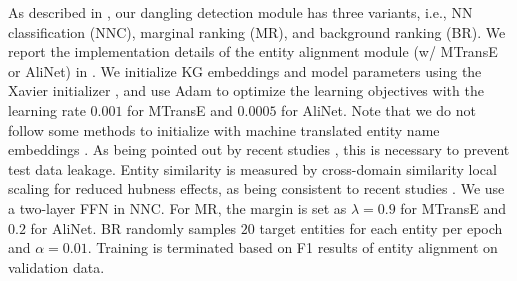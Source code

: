 \label{sec:config}
As described in , our dangling detection module has three variants, i.e., NN classification (NNC), marginal ranking (MR), and background ranking (BR). 
We report the implementation details of the entity alignment module (w/ MTransE or AliNet) in .
We initialize KG embeddings and model parameters using the Xavier initializer \cite{Xavier}, and use Adam \cite{Adam} to optimize the learning objectives with the learning rate $0.001$ for MTransE and $0.0005$ for AliNet. 
Note that we do not follow some methods to initialize with machine translated entity name embeddings \cite{NMN_acl20}.
As being pointed out by recent studies \cite{JEANS,EVA,AttrGNN}, this is necessary to prevent test data leakage.
Entity similarity is measured by cross-domain similarity local scaling \cite{CSLS} for reduced hubness effects, as being consistent to recent studies \cite{AliNet,JEANS}.
We use a two-layer FFN in NNC. 
For MR, the margin is set as $\lambda=0.9$ for MTransE and $0.2$ for AliNet.
BR randomly samples $20$ target entities for each entity per epoch and $\alpha=0.01$.
Training is terminated based on F1 results of entity alignment on validation data.

